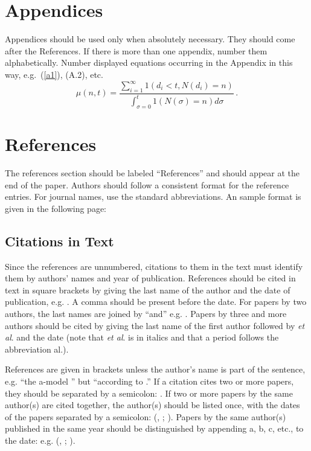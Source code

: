 \documentclass{IJCS_template}
\begin{document}
{\appendix

\section{Appendices}

Appendices should be used only when absolutely necessary. They should
come after the References. If there is more than one appendix, number
them alphabetically. Number displayed equations occurring in the
Appendix in this way, e.g.~(\ref{a1}), (A.2), etc.
\begin{equation}
\mu(n, t) = \frac{\sum^\infty_{i=1} 1(d_i < t,
N(d_i) = n)}{\int^t_{\sigma=0} 1(N(\sigma) = n)d\sigma}\,.
\label{a1}
\end{equation}

\section*{References}
The references section should be labeled ``References'' and should appear
at the end of the paper. Authors should follow a consistent format
for the reference entries. For journal names, use the standard abbreviations.
An sample format is given in the following page:

\subsection*{Citations in Text}
Since the references are unnumbered, citations to them in the text
must identify them by authors' names and year of
publication. References should be cited in text in square brackets by
giving the last name of the author and the date of publication,
e.g. \cite{wong89}. A comma should be present before the date.  For
papers by two authors, the last names are joined by ``and''
e.g. \cite{hussaini}. Papers by three and more authors should be cited
by  giving the last name of the first author followed by {\it et al}.
and the date (note that {\it et al}. is in italics and that a period
follows the abbreviation al.).

References are given in brackets unless the author's name is part
of the sentence, e.g. ``the a-model \cite{gupta97}''
but ``according to \citeauthor{gupta97} .''
If a citation cites two or more papers, they should be separated
by a semicolon: \cite{gurland94,wong89}.
If two or more papers by the same author(s) are cited together, the
author(s) should be listed once, with the dates of the papers separated
by a semicolon:
(\citeauthor{gurland94}, \citeyear{gurland94}; \citeyear{gurland95}).
Papers by the same author(s) published in the same
year should be distinguished by appending a, b, c, etc., to the
date: e.g. (\citeauthor{gupta95a}, \citeyear{gupta95a}; \citeyear{gupta95b}).

}
\end{document}
